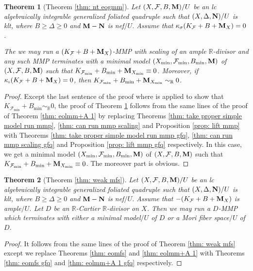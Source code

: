 \documentclass[11pt]{amsart}
\numberwithin{equation}{section}
\newcommand{\Mm}{{\bf{M}}}
\newcommand{\Nn}{{\bf{N}}}
\newcommand{\Rr}{\mathbb{R}}
\newcommand{\Ff}{\mathcal{F}}
\newtheorem{thm}{Theorem}[section]
\theoremstyle{definition}
\theoremstyle{definition}
\theoremstyle{definition}
\begin{document}
\begin{thm}[Theorem \ref{thm: nt eogmm}]\label{thm: nt eogmm gfq}
Let $(X,\Ff,B,\Mm)/U$ be an lc algebraically integrable generalized foliated quadruple such that $(X,\Delta,\Nn)/U$ is klt, where $B\geq\Delta\geq 0$ and $\Mm-\Nn$ is nef$/U$. Assume that $\kappa_{\sigma}(K_{\Ff}+B+\Mm_X)=0$.

    The we may run a $(K_{\Ff}+B+\Mm_X)$-MMP with scaling of an ample $\Rr$-divisor and any such MMP terminates with a minimal model $(X_{\min},\Ff_{\min},B_{\min},\Mm)$ of $(X,\Ff,B,\Mm)$ such that $K_{\Ff_{\min}}+B_{\min}+\Mm_{X_{\min}}\equiv 0$. Moreover, if $\kappa_{\iota}(K_{\Ff}+B+\Mm_X)=0$, then $K_{\Ff_{\min}}+B_{\min}+\Mm_{X_{\min}}\sim_{\mathbb R}0$.
\end{thm}
\begin{proof}
Except the last sentence of the proof where \cite[Theorem 1.4]{DLM23} is applied to show that $K_{\Ff_{\min}}+B_{\min}\sim_{\mathbb R}0$, the proof of Theorem \ref{thm: nt eogmm gfq} follows from the same lines of the proof of Theorem \ref{thm: eolmm+A 1} by replacing Theorems \ref{thm: take proper simple model run mmp}, \ref{thm: can run mmp scaling} and Proposition \ref{prop: lift mmp} with Theorems \ref{thm: take proper simple model run mmp gfq}, \ref{thm: can run mmp scaling gfq} and Proposition \ref{prop: lift mmp gfq} respectively. In this case, we get a minimal model $(X_{\min},\Ff_{\min},B_{\min},\Mm)$ of $(X,\Ff,B,\Mm)$ such that $K_{\Ff_{\min}}+B_{\min}+\Mm_{X_{\min}}\equiv 0$. The moreover part is obvious.
\end{proof}

\begin{thm}[Theorem \ref{thm: weak mfs}]\label{thm: weak mfs gfq}
Let $(X,\Ff,B,\Mm)/U$ be an lc algebraically integrable generalized foliated quadruple such that $(X,\Delta,\Nn)/U$ is klt, where $B\geq\Delta\geq 0$ and $\Mm-\Nn$ is nef$/U$. Assume that $-(K_{\Ff}+B+\Mm_X)$ is ample$/U$. Let $D$ be an  $\Rr$-Cartier $\Rr$-divisor on $X$. Then we may run a $D$-MMP which terminates with either a minimal model$/U$ of $D$ or a Mori fiber space$/U$ of $D$.
\end{thm}
\begin{proof}
It follows from the same lines of the proof of Theorem \ref{thm: weak mfs} except we replace Theorems \ref{thm: eomfs} and \ref{thm: eolmm+A 1} with Theorems \ref{thm: eomfs gfq} and \ref{thm: eolmm+A 1 gfq} respectively.
\end{proof}
\end{document}
